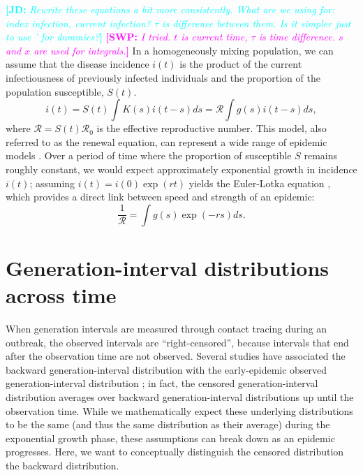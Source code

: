 \documentclass[12pt]{article}
\newcommand{\RR}{\ensuremath{{\mathcal R}}}
\newcommand{\comment}[3]{\textcolor{#1}{\textbf{[#2: }\textsl{#3}\textbf{]}}}
\newcommand{\jd}[1]{\comment{cyan}{JD}{#1}}
\newcommand{\swp}[1]{\comment{magenta}{SWP}{#1}}
\begin{document}
\jd{Rewrite these equations a bit more consistently. What are we using for: index infection, current infection? $\tau$ is difference between them. Is it simpler just to use ' for dummies?}
\swp{I tried. $t$ is current time, $\tau$ is time difference. $s$ and $x$ are used for integrals.}
In a homogeneously mixing population, we can assume that the disease incidence $i(t)$ is the product of the current infectiousness of previously infected individuals and the proportion of the population susceptible, $S(t)$.
\begin{equation}
i(t) = S(t) \int K(s) i(t-s) ds = \RR \int g(s) i(t-s) ds,
\end{equation}
where $\RR = S(t) \RR_0$ is the effective reproductive number.
This model, also referred to as the renewal equation, can represent a wide range of epidemic models \citep{heesterbeek1996concept, diekmann2000mathematical, roberts2004modelling, aldis2005integral, wallinga2007generation, roberts2007model}.
Over a period of time where the proportion of susceptible $S$ remains roughly constant, we would expect approximately exponential growth in incidence $i(t)$; assuming $i(t) = i(0) \exp(r t)$ yields the Euler-Lotka equation \citep{lotka1907relation}, which provides a direct link between speed and strength of an epidemic:
\begin{equation}
\frac{1}{\RR} = \int g(s) \exp(-r s) ds.
\end{equation}

\section{Generation-interval distributions across time}

When generation intervals are measured through contact tracing during an outbreak, 
the observed intervals are ``right-censored'', because intervals that end after the observation time are not observed. 
Several studies have associated the backward generation-interval distribution with the early-epidemic observed generation-interval distribution \citep{tomba2010some, nishiura2010time, champredon2015intrinsic, britton2019estimation};
in fact, the censored generation-interval distribution averages over backward generation-interval distributions up until the observation time.
While we mathematically expect these underlying distributions to be the same (and thus the same distribution as their average) during the exponential growth phase, these assumptions can break down as an epidemic progresses.
Here, we want to conceptually distinguish the censored distribution the backward distribution.
\end{document}
